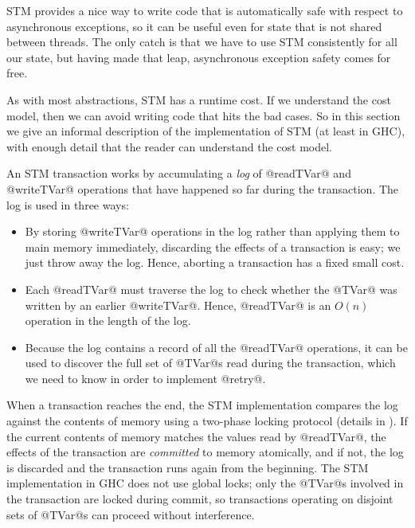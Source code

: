 STM provides a nice way to write code that is automatically safe with
respect to asynchronous exceptions, so it can be useful even for state
that is not shared between threads.  The only catch is that we have to
use STM consistently for all our state, but having made that leap,
asynchronous exception safety comes for free.


As with most abstractions, STM has a runtime cost.  If we understand
the cost model, then we can avoid writing code that hits the bad
cases.  So in this section we give an informal description of the
implementation of STM (at least in GHC), with enough detail that the
reader can understand the cost model.

An STM transaction works by accumulating a \emph{log} of @readTVar@
and @writeTVar@ operations that have happened so far during the
transaction.  The log is used in three ways:

\begin{itemize}
\item By storing @writeTVar@ operations in the log rather than
  applying them to main memory immediately, discarding the effects of
  a transaction is easy; we just throw away the log.  Hence, aborting
  a transaction has a fixed small cost.

\item Each @readTVar@ must traverse the log to check whether the
  @TVar@ was written by an earlier @writeTVar@.  Hence, @readTVar@ is
  an $O(n)$ operation in the length of the log.

\item Because the log contains a record of all the @readTVar@
  operations, it can be used to discover the full set of @TVar@s read
  during the transaction, which we need to know in order to implement
  @retry@.
\end{itemize}

When a transaction reaches the end, the STM implementation compares
the log against the contents of memory using a two-phase locking
protocol (details in \citet{stm}).  If the current contents of memory
matches the values read by @readTVar@, the effects of the transaction
are \emph{committed} to memory atomically, and if not, the log is
discarded and the transaction runs again from the beginning.  The STM
implementation in GHC does not use global locks; only the @TVar@s
involved in the transaction are locked during commit, so transactions
operating on disjoint sets of @TVar@s can proceed without
interference.

